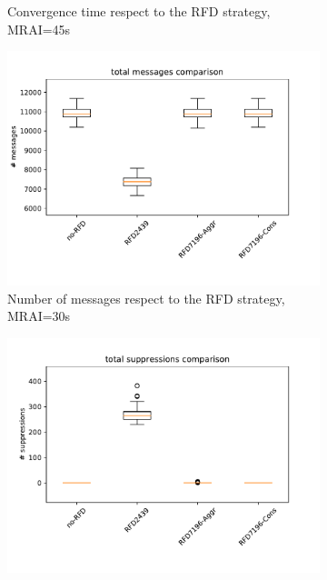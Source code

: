 \begin{figure}[H]
\begin{subfigure}[b]{0.325\textwidth}
         \caption{Convergence time respect to the RFD strategy, MRAI=45s}
         \label{fig:1000_RFD_MRAI30_time_mice}
     \end{subfigure}
     \hfill
     \begin{subfigure}[b]{0.325\textwidth}
         \centering
         \includegraphics[width=\textwidth]{images/RFD/miceVSelephants/MultiMRAI/45/mice/cisco_1000MRAI45_rfd_comparison_messages_boxplot.pdf}
         \caption{Number of messages respect to the RFD strategy, MRAI=30s}
         \label{fig:1000_RFD_MRAI30_messages_mice}
     \end{subfigure}
     \hfill
     \begin{subfigure}[b]{0.325\textwidth}
         \centering
         \includegraphics[width=\textwidth]{images/RFD/miceVSelephants/MultiMRAI/45/mice/cisco_1000MRAI45_rfd_comparison_suppressions_boxplot.pdf}

\end{subfigure}
\end{figure}
